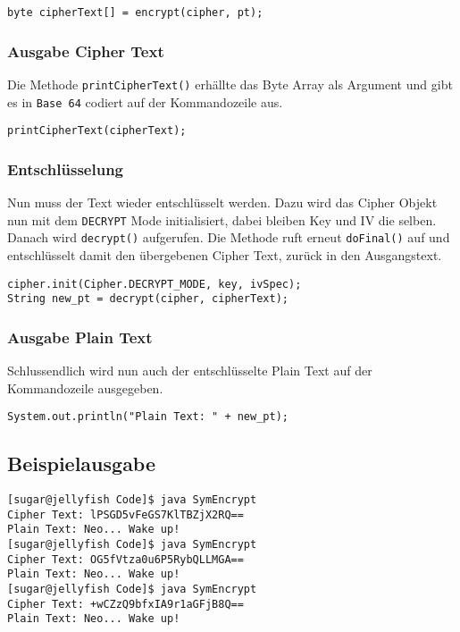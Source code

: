 \documentclass[12pt]{article}
\begin{document}
\begin{lstlisting}
byte cipherText[] = encrypt(cipher, pt);
\end{lstlisting}

\subsubsection{Ausgabe Cipher Text}
Die Methode \texttt{printCipherText()} erhällte das Byte Array als Argument und
gibt es in \texttt{Base 64} codiert auf der Kommandozeile aus.

\begin{lstlisting}
printCipherText(cipherText);
\end{lstlisting}

\subsubsection{Entschlüsselung}
Nun muss der Text wieder entschlüsselt werden. Dazu wird das Cipher Objekt nun
mit dem \texttt{DECRYPT} Mode initialisiert, dabei bleiben Key und IV die
selben. Danach wird \texttt{decrypt()} aufgerufen. Die Methode ruft erneut
\texttt{doFinal()} auf und entschlüsselt damit den übergebenen Cipher Text,
zurück in den Ausgangstext.

\begin{lstlisting}
cipher.init(Cipher.DECRYPT_MODE, key, ivSpec);
String new_pt = decrypt(cipher, cipherText);
\end{lstlisting}

\subsubsection{Ausgabe Plain Text}
Schlussendlich wird nun auch der entschlüsselte Plain Text auf der Kommandozeile
ausgegeben.

\begin{lstlisting}
System.out.println("Plain Text: " + new_pt); 
\end{lstlisting}

\subsection{Beispielausgabe}

\begin{lstlisting}
[sugar@jellyfish Code]$ java SymEncrypt 
Cipher Text: lPSGD5vFeGS7KlTBZjX2RQ==
Plain Text: Neo... Wake up!
[sugar@jellyfish Code]$ java SymEncrypt 
Cipher Text: OG5fVtza0u6P5RybQLLMGA==
Plain Text: Neo... Wake up!
[sugar@jellyfish Code]$ java SymEncrypt 
Cipher Text: +wCZzQ9bfxIA9r1aGFjB8Q==
Plain Text: Neo... Wake up!
\end{lstlisting}
\end{document}
